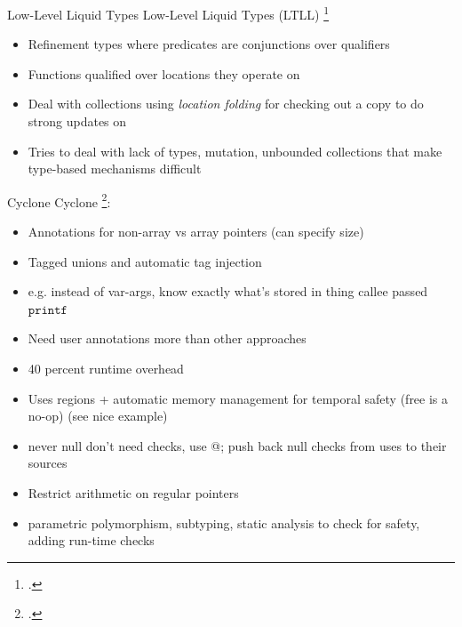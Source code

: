 \documentclass[aspectratio=169]{beamer}
\begin{document}
\begin{frame}{Low-Level Liquid Types}
Low-Level Liquid Types (LTLL) \footcite{rondon_low-level_2010}
\begin{itemize}
    \item Refinement types where predicates are conjunctions over qualifiers
    \item Functions qualified over locations they operate on
    \item Deal with collections using \emph{location folding} for checking out a copy to do strong updates on
    \item Tries to deal with lack of types, mutation, unbounded collections that make type-based mechanisms difficult
\end{itemize}
\end{frame}

\begin{frame}{Cyclone}
Cyclone \footcite{jim_cyclone:_2002}: 
\begin{itemize}
    \item Annotations for non-array vs array pointers (can specify size) %
    \item Tagged unions and automatic tag injection
    \item e.g. instead of var-args, know exactly what's stored in thing callee passed $\texttt{printf}$
    \item Need user annotations more than other approaches
    \item 40 percent runtime overhead
    \item Uses regions + automatic memory management for temporal safety (free is a no-op) (see nice example)
    \item never null don't need checks, use @; push back null checks from uses to their sources
    \item Restrict arithmetic on regular pointers
    \item parametric polymorphism, subtyping, static analysis to check for safety, adding run-time checks
\end{itemize}
\end{frame}
\end{document}
